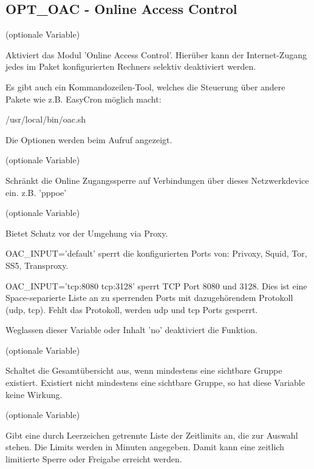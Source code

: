 \subsection{OPT\_OAC - Online Access Control}

\begin{description}

 (optionale Variable)

    Aktiviert das Modul 'Online Access Control'.
    Hierüber kann der Internet-Zugang jedes im Paket 
    konfigurierten Rechners selektiv deaktiviert werden.

    Es gibt auch ein Kommandozeilen-Tool, welches die Steuerung über
    andere Pakete wie z.B. EasyCron möglich macht:

    /usr/local/bin/oac.sh

    Die Optionen werden beim Aufruf angezeigt.

 (optionale Variable)

    Schränkt die Online Zugangssperre auf Verbindungen über dieses
    Netzwerkdevice ein. z.B. 'pppoe'

 (optionale Variable)

    Bietet Schutz vor der Umgehung via Proxy.
    
    OAC\_INPUT='default' sperrt die konfigurierten Ports von:
    Privoxy, Squid, Tor, SS5, Transproxy.
    
    OAC\_INPUT='tcp:8080 tcp:3128' sperrt TCP Port 8080 und 3128.
    Dies ist eine Space-separierte Liste an zu sperrenden Ports mit
    dazugehörendem Protokoll (udp, tcp). Fehlt das Protokoll, werden
    udp und tcp Ports gesperrt.
    
    Weglassen dieser Variable oder Inhalt 'no' deaktiviert die Funktion.

 (optionale Variable)

    Schaltet die Gesamtübersicht aus, wenn mindestens eine sichtbare Gruppe existiert.
    Existiert nicht mindestens eine sichtbare Gruppe, so hat diese Variable keine Wirkung.

 (optionale Variable)

    Gibt eine durch Leerzeichen getrennte Liste der Zeitlimits an, die zur Auswahl stehen.
    Die Limits werden in Minuten angegeben. Damit kann eine zeitlich limitierte Sperre oder
    Freigabe erreicht werden.


\end{description}
